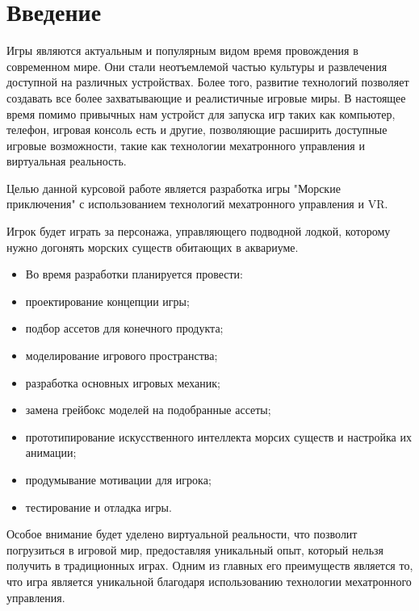 \documentclass{../mirea-prog-lang}
\begin{document}
	

	

\tableofcontents

\section*{Введение}
{}

Игры являются актуальным и популярным видом время провождения в современном мире. Они стали неотъемлемой частью культуры и развлечения доступной на различных устройствах. Более того, развитие технологий позволяет создавать все более захватывающие и реалистичные игровые миры. В настоящее время помимо привычных нам устройст для запуска игр таких как компьютер, телефон, игровая консоль есть и другие, позволяющие расширить доступные игровые возможности, такие как технологии мехатронного управления и виртуальная реальность.

Целью данной курсовой работе является разработка игры "Морские приключения" с использованием технологий мехатронного управления и VR.

Игрок будет играть за персонажа, управляющего подводной лодкой, которому нужно догонять морских существ обитающих в аквариуме.

\begin{itemize}
	\item[] Во время разработки планируется провести:
	\item проектирование концепции игры;
	\item подбор ассетов для конечного продукта;
	\item моделирование игрового пространства;
	\item разработка основных игровых механик;
	\item замена грейбокс моделей на подобранные ассеты;
	\item прототипирование искусственного интеллекта морсих существ и настройка их анимации;
	\item продумывание мотивации для игрока;
	\item тестирование и отладка игры.
\end{itemize}

Особое внимание будет уделено виртуальной реальности, что позволит погрузиться в игровой мир, предоставляя уникальный опыт, который нельзя получить в традиционных играх. Одним из главных его преимуществ является то, что игра является уникальной благодаря использованию технологии мехатронного управления.
\end{document}
